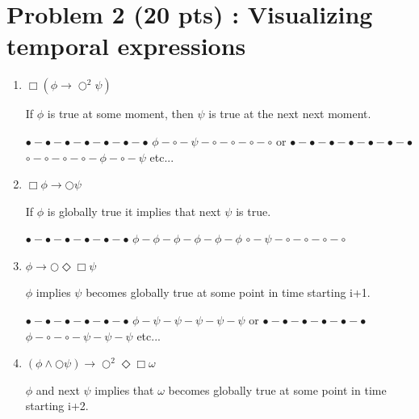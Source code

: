 \documentclass[12pt]{article}
\begin{document}
\newpage

\section*{Problem 2 (20 pts) :  Visualizing temporal expressions}

\begin{enumerate}

	\item $\Box (\phi \rightarrow \bigcirc^{2} \psi)$
	
	If $\phi$ is true at some moment, then $\psi$ is true at the next 		next moment.
	
	$\bullet-\bullet-\bullet-\bullet-\bullet-\bullet-\bullet$ \newline
	$\phi-\circ-\psi-\circ-\circ-\circ-\circ$ \newline
	or \newline
	$\bullet-\bullet-\bullet-\bullet-\bullet-\bullet-\bullet$ \newline
	$\circ-\circ-\circ-\circ-\phi-\circ-\psi$ \newline
	etc... 

	\item $\Box \phi \rightarrow \bigcirc \psi$
	
	If $\phi$ is globally true it implies that next $\psi$ is true.
	
	$\bullet-\bullet-\bullet-\bullet-\bullet-\bullet$ \newline
	$\phi-\phi-\phi-\phi-\phi-\phi$ \newline
	$\circ-\psi-\circ-\circ-\circ-\circ$
	
	\item $\phi \rightarrow \bigcirc \Diamond \Box \psi$
	
	$\phi$ implies $\psi$ becomes globally true at some point in time starting i+1.
	
	$\bullet-\bullet-\bullet-\bullet-\bullet-\bullet$ \newline
	$\phi-\psi-\psi-\psi-\psi-\psi$ \newline
	or \newline
	$\bullet-\bullet-\bullet-\bullet-\bullet-\bullet$ \newline
	$\phi-\circ-\circ-\psi-\psi-\psi$ \newline
	etc...
	
	\item $(\phi \wedge \bigcirc \psi) \rightarrow \bigcirc^{2} \Diamond \Box \omega$
	
	$\phi$ and next $\psi$ implies that $\omega$ becomes globally true at some point in time starting i+2.
	

\end{enumerate}
\end{document}
